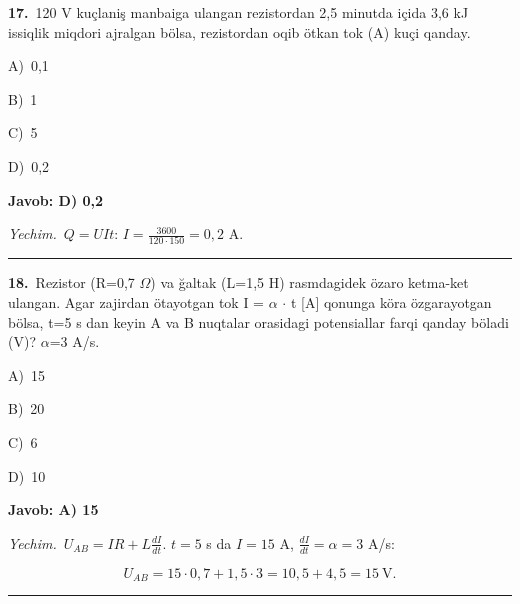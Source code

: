 \documentclass[11pt,a4paper]{article}
\newcommand{\opt}[2]{\hspace*{4mm}#1)\ #2\par}
\begin{document}
\noindent\begin{minipage}{\linewidth}
\textbf{17.}\ 120 V kuçlaniş manbaiga ulangan rezistordan 2,5 minutda içida 3,6 kJ issiqlik miqdori ajralgan bölsa, rezistordan oqib ötkan tok (A) kuçi qanday.\par\smallskip
\opt{A}{0,1}
\opt{B}{1}
\opt{C}{5}
\opt{D}{0,2}
\end{minipage}\vspace{2pt}\par
\noindent\colorbox{gray!12}{\parbox{\dimexpr\linewidth-2\fboxsep}{\textbf{Javob: D) 0,2}}}\par\smallskip
\noindent\textit{Yechim.}\ $Q=UIt$: $I=\frac{3600}{120\cdot150}=0{,}2$ A.\par\par\medskip\hrule\medskip
{}\noindent\begin{minipage}{\linewidth}
\textbf{18.}\ Rezistor (R=0,7 $\Omega$) va ğaltak (L=1,5 H) rasmdagidek özaro ketma-ket ulangan. Agar zajirdan ötayotgan tok I = $\alpha$ $\cdot$ t [A] qonunga köra özgarayotgan bölsa, t=5 s dan keyin A va B nuqtalar orasidagi potensiallar farqi qanday böladi (V)? $\alpha$=3 A/s.\par\smallskip
\noindent\hspace*{4mm}\par\smallskip
\opt{A}{15}
\opt{B}{20}
\opt{C}{6}
\opt{D}{10}
\end{minipage}\vspace{2pt}\par
\noindent\colorbox{gray!12}{\parbox{\dimexpr\linewidth-2\fboxsep}{\textbf{Javob: A) 15}}}\par\smallskip
\noindent\textit{Yechim.}\ $U_{AB}=IR+L\frac{dI}{dt}$. $t=5$ s da $I=15$ A, $\frac{dI}{dt}=\alpha=3$ A/s:\par
\[U_{AB}=15\cdot0{,}7+1{,}5\cdot3=10{,}5+4{,}5=15\ \text{V}.\]\par\medskip\hrule\medskip
\end{document}
